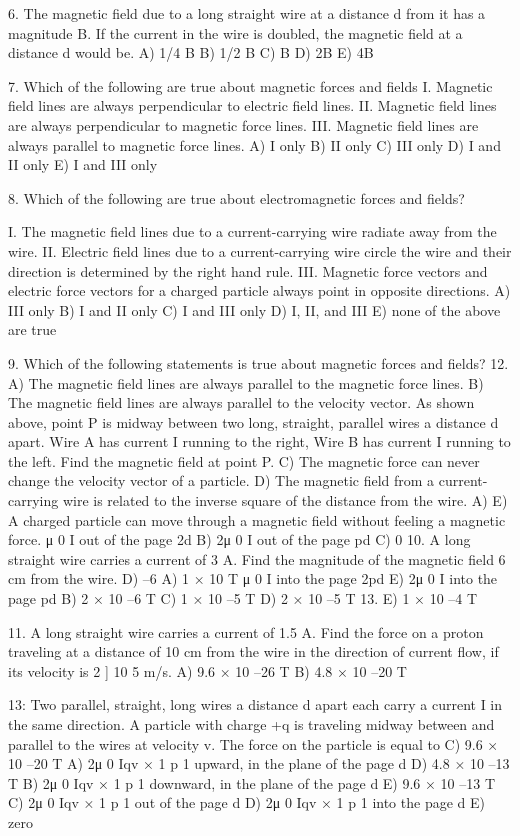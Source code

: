 6. The magnetic field due to a long straight wire at a distance d
from it has a magnitude B. If the current in the wire is
doubled, the magnetic field at a distance d would be.
A) 1/4 B
B) 1/2 B
C) B
D) 2B
E) 4B



7. Which of the following are true about magnetic forces and
fields
I. Magnetic field lines are always perpendicular to electric field lines.
II. Magnetic field lines are always perpendicular to magnetic force lines.
III. Magnetic field lines are always parallel to magnetic force lines.
A) I only
B) II only
C) III only
D) I and II only
E) I and III only

8. Which of the following are true about electromagnetic forces and fields?

I. The magnetic field lines due to a current-carrying wire radiate away from the wire.
II. Electric field lines due to a current-carrying wire circle the wire and their direction is determined by the right hand rule.
III. Magnetic force vectors and electric force vectors for a charged particle always point in opposite directions.
A) III only
B) I and II only
C) I and III only
D) I, II, and III
E) none of the above are true




9. Which of the following statements is true about magnetic
forces and fields?
12.
A) The magnetic field lines are always parallel to the
magnetic force lines.
B) The magnetic field lines are always parallel to the
velocity vector.
As shown above, point P is midway between two long,
straight, parallel wires a distance d apart. Wire A has
current I running to the right, Wire B has current I running
to the left. Find the magnetic field at point P.
C) The magnetic force can never change the velocity
vector of a particle.
D) The magnetic field from a current-carrying wire is
related to the inverse square of the distance from the
wire.
A)
E) A charged particle can move through a magnetic field
without feeling a magnetic force.
μ 0 I out of the page
2d
B) 2μ 0 I out of the page
pd
C) 0
10. A long straight wire carries a current of 3 A. Find the
magnitude of the magnetic field 6 cm from the wire.
D)
–6
A) 1 × 10 T
μ 0 I into the page
2pd
E) 2μ 0 I into the page
pd
B) 2 × 10 –6 T
C) 1 × 10 –5 T
D) 2 × 10 –5 T
13.
E) 1 × 10 –4 T

11. A long straight wire carries a current of 1.5 A. Find the
force on a proton traveling at a distance of 10 cm from the
wire in the direction of current flow, if its velocity is
2 ] 10 5 m/s.
A) 9.6 × 10 –26 T
B) 4.8 × 10 –20 T


13:
Two parallel, straight, long wires a distance d apart each
carry a current I in the same direction. A particle with
charge +q is traveling midway between and parallel to the
wires at velocity v. The force on the particle is equal to
C) 9.6 × 10 –20 T A) 2μ 0 Iqv × 1 p 1 upward, in the plane of the page
d
D) 4.8 × 10 –13 T B) 2μ 0 Iqv × 1 p 1 downward, in the plane of the page
d
E) 9.6 × 10 –13 T C) 2μ 0 Iqv × 1 p 1 out of the page
d
D) 2μ 0 Iqv × 1 p 1 into the page
d
E) zero







\endinput


